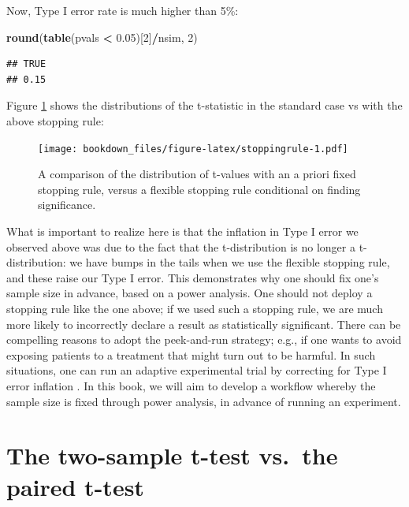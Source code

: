 \documentclass[12pt,]{krantz}
\newenvironment{Shaded}{\begin{snugshade}}{\end{snugshade}}
\newcommand{\DecValTok}[1]{\textcolor[rgb]{0.00,0.00,0.81}{#1}}
\newcommand{\FloatTok}[1]{\textcolor[rgb]{0.00,0.00,0.81}{#1}}
\newcommand{\KeywordTok}[1]{\textcolor[rgb]{0.13,0.29,0.53}{\textbf{#1}}}
\newcommand{\NormalTok}[1]{#1}
\newcommand{\OperatorTok}[1]{\textcolor[rgb]{0.81,0.36,0.00}{\textbf{#1}}}
\newcommand{\StringTok}[1]{\textcolor[rgb]{0.31,0.60,0.02}{#1}}
\begin{document}
Now, Type I error rate is much higher than 5\%:

\begin{Shaded}
\begin{Highlighting}[]
\KeywordTok{round}\NormalTok{(}\KeywordTok{table}\NormalTok{(pvals }\OperatorTok{<}\StringTok{ }\FloatTok{0.05}\NormalTok{)[}\DecValTok{2}\NormalTok{]}\OperatorTok{/}\NormalTok{nsim, }\DecValTok{2}\NormalTok{)}
\end{Highlighting}
\end{Shaded}

\begin{verbatim}
## TRUE 
## 0.15
\end{verbatim}

Figure \ref{fig:stoppingrule} shows the distributions of the t-statistic in the standard case vs with the above stopping rule:

\begin{figure}
\centering
\texttt{[image: bookdown\_files/figure-latex/stoppingrule-1.pdf]}
\caption{\label{fig:stoppingrule}A comparison of the distribution of t-values with an a priori fixed stopping rule, versus a flexible stopping rule conditional on finding significance.}
\end{figure}

What is important to realize here is that the inflation in Type I error we observed above was due to the fact that the t-distribution is no longer a t-distribution: we have bumps in the tails when we use the flexible stopping rule, and these raise our Type I error. This demonstrates why one should fix one's sample size in advance, based on a power analysis. One should not deploy a stopping rule like the one above; if we used such a stopping rule, we are much more likely to incorrectly declare a result as statistically significant. There can be compelling reasons to adopt the peek-and-run strategy; e.g., if one wants to avoid exposing patients to a treatment that might turn out to be harmful. In such situations, one can run an adaptive experimental trial by correcting for Type I error inflation \citep{pocock2013clinical}. In this book, we will aim to develop a workflow whereby the sample size is fixed through power analysis, in advance of running an experiment.

\hypertarget{the-two-sample-t-test-vs.the-paired-t-test}{%
\section{The two-sample t-test vs.~the paired t-test}\label{the-two-sample-t-test-vs.the-paired-t-test}}
\end{document}
